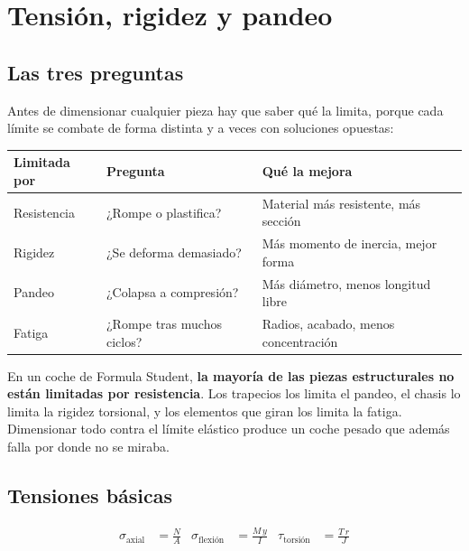 \section{Tensión, rigidez y pandeo}
\label{sec:mecanica_aplicada:02}

\subsection{Las tres preguntas}

Antes de dimensionar cualquier pieza hay que saber qué la limita, porque cada
límite se combate de forma distinta y a veces con soluciones opuestas:

\begin{center}
\begin{tabularx}{\textwidth}{@{}lXl@{}}
\toprule
\textbf{Limitada por} & \textbf{Pregunta} & \textbf{Qué la mejora} \\
\midrule
Resistencia & ¿Rompe o plastifica? & Material más resistente, más sección \\
Rigidez     & ¿Se deforma demasiado? & Más momento de inercia, mejor forma \\
Pandeo      & ¿Colapsa a compresión? & Más diámetro, menos longitud libre \\
Fatiga      & ¿Rompe tras muchos ciclos? & Radios, acabado, menos concentración \\
\bottomrule
\end{tabularx}
\end{center}

En un coche de Formula Student, \textbf{la mayoría de las piezas estructurales no
están limitadas por resistencia}. Los trapecios los limita el pandeo, el chasis
lo limita la rigidez torsional, y los elementos que giran los limita la fatiga.
Dimensionar todo contra el límite elástico produce un coche pesado que además
falla por donde no se miraba.

\subsection{Tensiones básicas}

\begin{align}
  \sigma_{\text{axial}} &= \frac{N}{A} &
  \sigma_{\text{flexión}} &= \frac{M\,y}{I} &
  \tau_{\text{torsión}}  &= \frac{T\,r}{J}
  \label{eq:tensiones_basicas}
\end{align}

